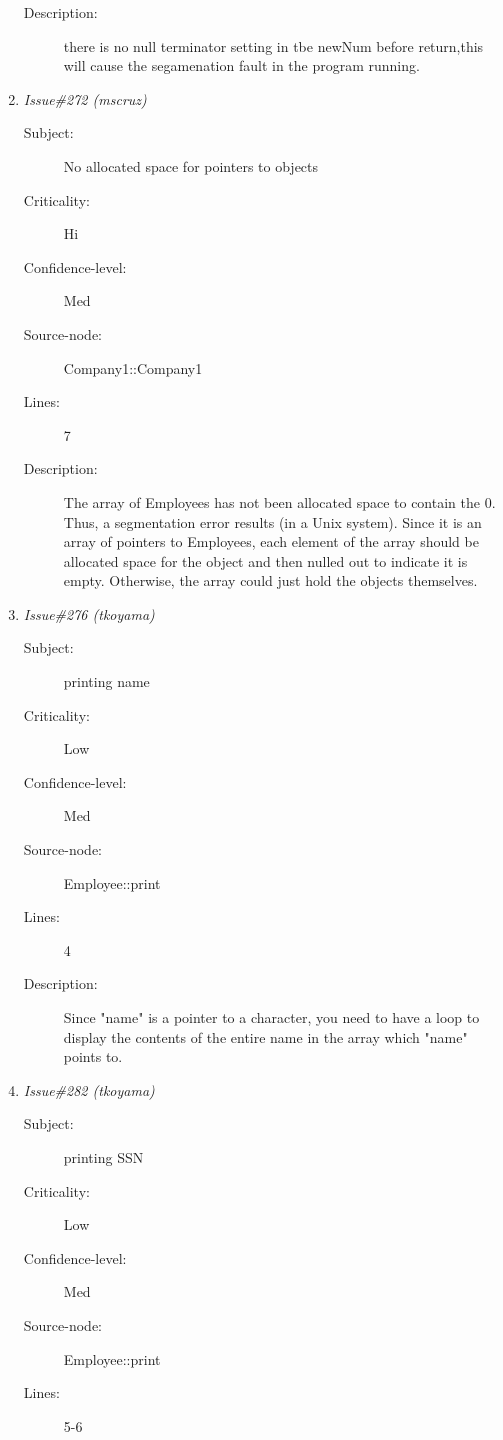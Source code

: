 \begin{enumerate}
\begin{description}
\item [Description:] there is no null terminator setting in tbe
newNum before return,this will cause the segamenation fault in the program
running.
\end{description}
\item {\it Issue\#272 (mscruz)}
\begin{description}
\item [Subject:] No allocated space for pointers to objects
\item [Criticality:] Hi
\item [Confidence-level:] Med
\item [Source-node:] Company1::Company1

\item [Lines:] 7

\item [Description:] The array of Employees has not been allocated
space to contain the 0.  Thus, a segmentation error results (in a Unix
system). Since it is an array of pointers to Employees, each element of the
array should be allocated space for the object and then nulled out to
indicate it is empty.  Otherwise, the array could just hold the objects
themselves.
\end{description}
\item {\it Issue\#276 (tkoyama)}
\begin{description}
\item [Subject:] printing name
\item [Criticality:] Low
\item [Confidence-level:] Med
\item [Source-node:] Employee::print

\item [Lines:] 4

\item [Description:] Since "name" is a pointer to a character, you
need to have a loop to display the contents of the entire name in the array
which "name" points to.
\end{description}
\item {\it Issue\#282 (tkoyama)}
\begin{description}
\item [Subject:] printing SSN
\item [Criticality:] Low
\item [Confidence-level:] Med
\item [Source-node:] Employee::print

\item [Lines:] 5-6


\end{description}
\end{enumerate}
